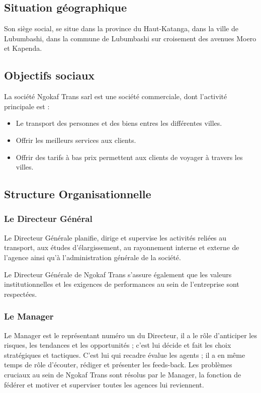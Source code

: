         \subsection[Situation géographique]{Situation géographique}
        Son siège social, se situe dans la province du Haut-Katanga, dans la ville de Lubumbashi,
        dans la commune de Lubumbashi sur croisement des avenues Moero et Kapenda.        

        \subsection[Objectifs sociaux]{Objectifs sociaux}
        La société Ngokaf Trans \acrshort{sarl} est une société commerciale,
        dont l’activité principale est :
        \par
        \begin{itemize}
            \setlength{\itemsep}{0pt}
            \item [\ding{226}] Le transport des personnes et des biens entres les différentes villes.
            \item [\ding{226}] Offrir les meilleurs services aux clients.
            \item [\ding{226}] Offrir des tarifs à bas prix permettent aux clients de voyager à travers les villes.
        \end{itemize}
        \subsection[Structure Organisationnelle]{Structure Organisationnelle}
            \subsubsection[Le Directeur Général]{Le Directeur Général}
            Le Directeur Générale planifie, dirige et supervise les activités reliées
            au transport, aux études d’élargissement, au rayonnement interne et externe
            de l’agence ainsi qu’à l’administration générale de la société.
            \par\noindent
            Le Directeur Générale de Ngokaf Trans s’assure également que les valeurs
            institutionnelles et les exigences de performances au sein de l’entreprise sont respectées.

            \subsubsection[Le Manager]{Le Manager}
            Le Manager est le représentant numéro un du Directeur,
            il a le rôle d’anticiper les risques, les tendances et les opportunités ; c’est lui décide
            et fait les choix stratégiques et tactiques. C’est lui qui recadre évalue les agents ;
            il a en même temps de rôle d’écouter, rédiger et présenter les feeds-back.
            Les problèmes cruciaux au sein de Ngokaf Trans sont résolus par le Manager,
            la fonction de fédérer et motiver et superviser toutes les agences lui reviennent.

